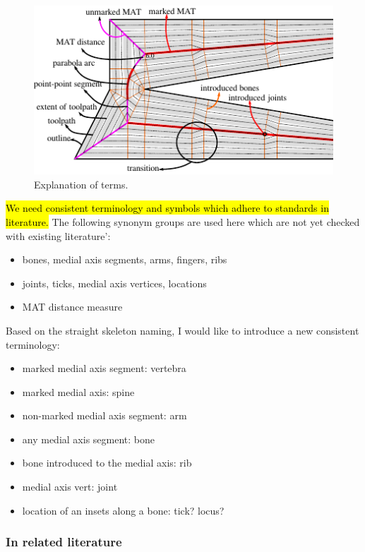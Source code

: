 \begin{figure}
\includegraphics[width=\columnwidth]{sources/method/legend_double_wedge_example.pdf}
\caption{Explanation of terms.}
\label{legend}
\end{figure}



\hl{We need consistent terminology and symbols which adhere to standards in literature.}
The following synonym groups are used here which are not yet checked with existing literature':
\begin{itemize}
\item bones, medial axis segments, arms, fingers, ribs
\item joints, ticks, medial axis vertices, locations
\item MAT distance measure
\end{itemize}


Based on the straight skeleton naming, I would like to introduce a new consistent terminology:
\begin{itemize}
\item marked medial axis segment: vertebra
\item marked medial axis: spine
\item non-marked medial axis segment: arm
\item any medial axis segment: bone
\item bone introduced to the medial axis: rib
\item medial axis vert: joint
\item location of an insets along a bone: tick? locus?
\end{itemize}


\subsubsection{In related literature}

